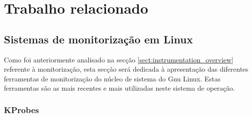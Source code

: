 \chapter{Trabalho relacionado}
\label{cap:trabrelacionado}

 
% 
% 



\section{Sistemas de monitorização em Linux}\label{sect:instrumentacao_casos_linux}

Como foi anteriormente analisado na secção \ref{sect:instrumentation_overview} referente à monitorização, esta secção será dedicada à apresentação das diferentes ferramentas de monitorização do núcleo de sistema do Gnu Linux. Estas ferramentas são as mais recentes e mais utilizadas neste sistema de operação.


\subsection{KProbes}\label{sect:KProbes_overview}

